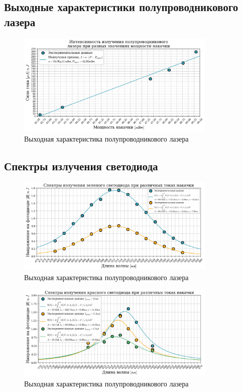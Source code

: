 \documentclass[a4paper, 12pt]{extarticle}
\begin{document}
\subsection*{\textcolor{sub_header}{Выходные характеристики полупроводникового лазера}}

\begin{figure}[htbp]
    \centering
    \includegraphics[width = 0.85\textwidth]{lazer.png}
    \caption{Выходная характеристика полупроводникового лазера}
    \label{fig:lazer}
\end{figure}

\subsection*{\textcolor{sub_header}{Спектры излучения светодиода}}


\begin{figure}[htbp]
    \centering
    \includegraphics[width = 0.85\textwidth]{green.png}
    \caption{Выходная характеристика полупроводникового лазера}
    \label{fig:green}
\end{figure}


\begin{figure}[htbp]
    \centering
    \includegraphics[width = 0.85\textwidth]{red.png}
    \caption{Выходная характеристика полупроводникового лазера}
    \label{fig:red}
\end{figure}
\end{document}
